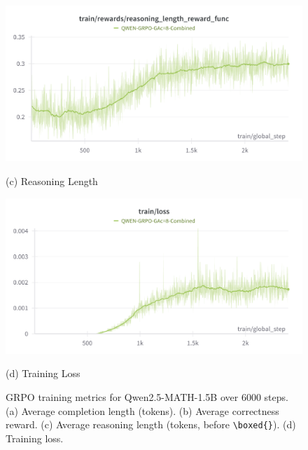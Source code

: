 \documentclass[11pt]{article}
\begin{document}
\begin{itemize}
\begin{figure}[htbp]
    \vspace{1em} %

    \begin{minipage}{0.48\textwidth}
        \centering
        \includegraphics[width=\linewidth]{Qwen/reasoning_length_reward.png} %
        \caption*{(c) Reasoning Length}
    \end{minipage}\hfill
    \begin{minipage}{0.48\textwidth}
        \centering
        \includegraphics[width=\linewidth]{Qwen/train_loss.png} %
        \caption*{(d) Training Loss}
    \end{minipage}

    \caption{GRPO training metrics for Qwen2.5-MATH-1.5B over 6000 steps. (a) Average completion length (tokens). (b) Average correctness reward. (c) Average reasoning length (tokens, before \texttt{\textbackslash boxed\{\}}). (d) Training loss.}
    \label{fig:grpo_qwen_analysis}
\end{figure}


\end{itemize}
\end{document}
